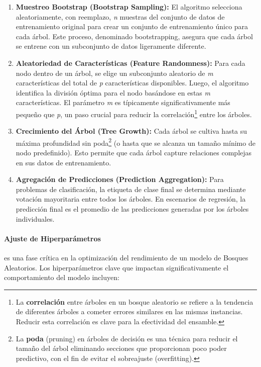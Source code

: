 \begin{enumerate}
    \item \textbf{Muestreo Bootstrap (Bootstrap Sampling):} El algoritmo selecciona aleatoriamente, con reemplazo, \textit{n} muestras del conjunto de datos de entrenamiento original para crear un conjunto de entrenamiento único para cada árbol.
    Este proceso, denominado bootstrapping, asegura que cada árbol se entrene con un subconjunto de datos ligeramente diferente.
    \item \textbf{Aleatoriedad de Características (Feature Randomness):} Para cada nodo dentro de un árbol, se elige un subconjunto aleatorio de \textit{m} características del total de \textit{p} características disponibles.
    Luego, el algoritmo identifica la división óptima para el nodo basándose en estas \textit{m} características.
    El parámetro \textit{m} es típicamente significativamente más pequeño que \textit{p}, un paso crucial para reducir la correlación\footnote{La \textbf{correlación} entre árboles en un bosque aleatorio se refiere a la tendencia de diferentes árboles a cometer errores similares en las mismas instancias.
Reducir esta correlación es clave para la efectividad del ensamble.} entre los árboles.
    \item \textbf{Crecimiento del Árbol (Tree Growth):} Cada árbol se cultiva hasta su máxima profundidad sin poda\footnote{La \textbf{poda} (pruning) en árboles de decisión es una técnica para reducir el tamaño del árbol eliminando secciones que proporcionan poco poder predictivo, con el fin de evitar el sobreajuste (overfitting).} (o hasta que se alcanza un tamaño mínimo de nodo predefinido).
    Esto permite que cada árbol capture relaciones complejas en sus datos de entrenamiento.
    \item \textbf{Agregación de Predicciones (Prediction Aggregation):} Para problemas de clasificación, la etiqueta de clase final se determina mediante votación mayoritaria entre todos los árboles.
    En escenarios de regresión, la predicción final es el promedio de las predicciones generadas por los árboles individuales.
\end{enumerate}

\paragraph{Ajuste de Hiperparámetros}
es una fase crítica en la optimización del rendimiento de un modelo de Bosques Aleatorios.
Los hiperparámetros clave que impactan significativamente el comportamiento del modelo incluyen:

